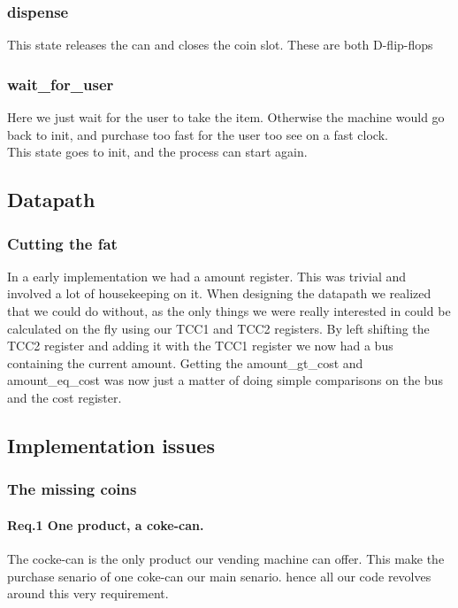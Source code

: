 \subsubsection{dispense}
This state releases the can and closes the coin slot. These are both D-flip-flops

\subsubsection{wait\_for\_user}
Here we just wait for the user to take the item. Otherwise the machine would go back to init, and purchase too fast for the user too see on a fast clock.\\
This state goes to init, and the process can start again.

\subsection{Datapath}
\subsubsection{Cutting the fat}
In a early implementation we had a amount register. This was trivial and involved a lot of housekeeping on it. When designing the datapath we realized that we could do without, as the only things we were really interested in could be calculated on the fly using our TCC1 and TCC2 registers. By left shifting the TCC2 register and adding it with the TCC1 register we now had a bus containing the current amount. Getting the amount\_gt\_cost and amount\_eq\_cost was now just a matter of doing simple comparisons on the bus and the cost register.


\subsection{Implementation issues}
\label{sec:implementation_issues}
\subsubsection{The missing coins}
\label{sec:missing_coins}

\paragraph{Req.1 One product, a coke-can.}
The cocke-can is the only product our vending machine can offer. This make the purchase senario of one coke-can our main senario. hence all our code revolves around this very requirement.


